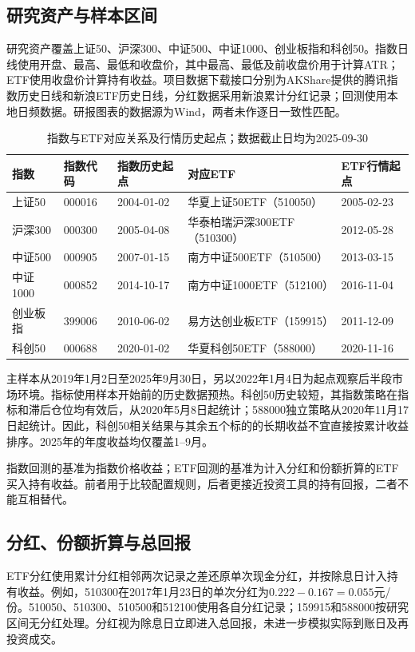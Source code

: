 \documentclass[UTF8,a4paper,11pt,fontset=fandol]{ctexart}
\begin{document}
\subsection{研究资产与样本区间}
研究资产覆盖上证50、沪深300、中证500、中证1000、创业板指和科创50。指数日线使用开盘、最高、最低和收盘价，其中最高、最低及前收盘价用于计算ATR；ETF使用收盘价计算持有收益。项目数据下载接口分别为AKShare提供的腾讯指数历史日线和新浪ETF历史日线，分红数据采用新浪累计分红记录；回测使用本地日频数据。研报图表的数据源为Wind，两者未作逐日一致性匹配。

\begin{table}[htbp]\centering\small
\caption{指数与ETF对应关系及行情历史起点；数据截止日均为2025-09-30}
\begin{tabularx}{\linewidth}{l l l Y l}\toprule
指数 & 指数代码 & 指数历史起点 & 对应ETF & ETF行情起点\\\midrule
上证50 & 000016 & 2004-01-02 & 华夏上证50ETF（510050） & 2005-02-23\\
沪深300 & 000300 & 2005-04-08 & 华泰柏瑞沪深300ETF（510300） & 2012-05-28\\
中证500 & 000905 & 2007-01-15 & 南方中证500ETF（510500） & 2013-03-15\\
中证1000 & 000852 & 2014-10-17 & 南方中证1000ETF（512100） & 2016-11-04\\
创业板指 & 399006 & 2010-06-02 & 易方达创业板ETF（159915） & 2011-12-09\\
科创50 & 000688 & 2020-01-02 & 华夏科创50ETF（588000） & 2020-11-16\\\bottomrule
\end{tabularx}
\end{table}

主样本从2019年1月2日至2025年9月30日，另以2022年1月4日为起点观察后半段市场环境。指标使用样本开始前的历史数据预热。科创50历史较短，其指数策略在指标和滞后仓位均有效后，从2020年5月8日起统计；588000独立策略从2020年11月17日起统计。因此，科创50相关结果与其余五个标的的长期收益不宜直接按累计收益排序。2025年的年度收益均仅覆盖1--9月。

指数回测的基准为指数价格收益；ETF回测的基准为计入分红和份额折算的ETF买入持有收益。前者用于比较配置规则，后者更接近投资工具的持有回报，二者不能互相替代。

\subsection{分红、份额折算与总回报}
ETF分红使用累计分红相邻两次记录之差还原单次现金分红，并按除息日计入持有收益。例如，510300在2017年1月23日的单次分红为$0.222-0.167=0.055$元/份。510050、510300、510500和512100使用各自分红记录；159915和588000按研究区间无分红处理。分红视为除息日立即进入总回报，未进一步模拟实际到账日及再投资成交。
\end{document}
